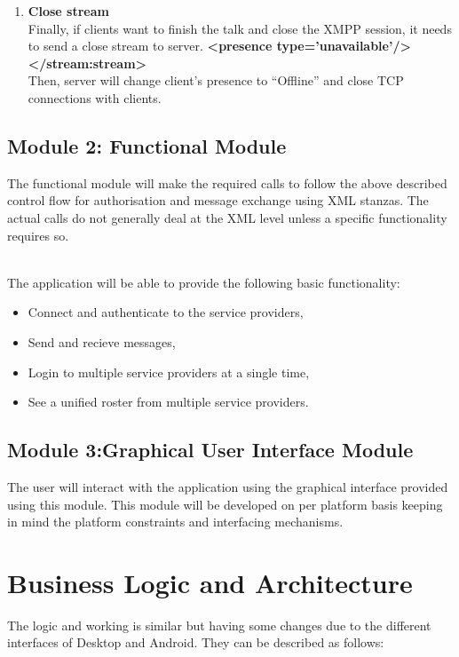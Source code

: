 \documentclass{SureshLimkar}
\begin{document}
\begin{enumerate}
\item \textbf{Close stream}\\
Finally, if clients want to finish the talk and close the XMPP session, it needs to send a close stream to server.
\textbf{<presence type='unavailable'/></stream:stream>}
\\
Then, server will change client's presence to “Offline” and close TCP connections with clients.
\\

\end{enumerate}



\subsection{Module 2: Functional Module}
\hspace{0.5 in}The functional module will make the required calls to follow the above described control flow for authorisation and message exchange using XML stanzas. The actual calls  do not generally deal at the XML level unless a specific functionality requires so.
\\
\\
 \item The application will be able to provide the following basic functionality:
\begin{itemize}
 \item Connect and authenticate to the service providers,
 \item Send and recieve messages,
\item Login to multiple service providers at a single time,
\item See a unified roster from multiple service providers. 
\end{itemize}


\subsection{Module 3:Graphical User Interface Module}
\hspace{0.5 in}The user will interact with the application using the graphical interface provided using this module. This module will be developed on per platform basis keeping in mind the platform constraints and interfacing mechanisms. 
\\


\section{Business Logic and Architecture}
\hspace{0.5 in}The logic and working is similar but having some changes due to the different interfaces of Desktop and Android. They can be described as follows:
\end{document}
